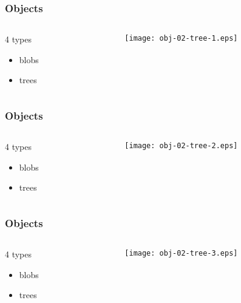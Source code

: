 \documentclass[english]{beamer}
\newcommand{\faint}[1]{%
\textcolor{code-gray}{#1}%
}
\begin{document}
\begin{frame}
\frametitle{Objects}
\begin{columns}[t]
        \begin{column}[T]{.5\textwidth}
                4 types
                \begin{itemize}
                        \item \faint{blobs}
                        \item trees
                \end{itemize}
        \end{column}
        \begin{column}[T]{.5\textwidth}
                \texttt{[image: obj-02-tree-1.eps]}
        \end{column}
\end{columns}
\end{frame}

\begin{frame}
\frametitle{Objects}
\begin{columns}[t]
        \begin{column}[T]{.5\textwidth}
                4 types
                \begin{itemize}
                        \item \faint{blobs}
                        \item trees
                \end{itemize}
        \end{column}
        \begin{column}[T]{.5\textwidth}
                \texttt{[image: obj-02-tree-2.eps]}
        \end{column}
\end{columns}
\end{frame}

\begin{frame}
\frametitle{Objects}
\begin{columns}[t]
        \begin{column}[T]{.5\textwidth}
                4 types
                \begin{itemize}
                        \item \faint{blobs}
                        \item trees
                \end{itemize}
        \end{column}
        \begin{column}[T]{.5\textwidth}
                \texttt{[image: obj-02-tree-3.eps]}
        \end{column}
\end{columns}
\end{frame}
\end{document}
